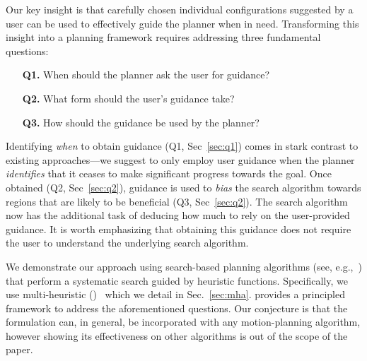 \documentclass{article}
\begin{document}
Our key insight is that carefully chosen individual configurations suggested by a user can be used to effectively guide the planner when in need.
Transforming this insight into a planning framework requires addressing three fundamental questions:

\begin{itemize}
	\item[\textbf{Q1.}] When should the planner ask the user for guidance?
	\item[\textbf{Q2.}] What form should the user's guidance take?
	\item[\textbf{Q3.}] How should the guidance be used by the planner?
\end{itemize}

Identifying \emph{when} to obtain guidance 
(Q1, Sec~\ref{sec:q1}) 
comes in stark contrast to existing approaches---we suggest to only employ user guidance when the planner \emph{identifies} that it ceases to make significant progress towards the goal.
Once obtained (Q2, Sec~\ref{sec:q2}), guidance is used to \emph{bias} the search algorithm towards regions that are likely to be beneficial (Q3, Sec~\ref{sec:q2}). 
The search algorithm now has the additional task of deducing how much to rely on the user-provided guidance.
It is worth emphasizing that obtaining this guidance does not require the user to understand the underlying search algorithm. 

% 



%
We demonstrate our approach using search-based planning algorithms (see, e.g.,~\cite{CCL14}) that perform a systematic search guided by heuristic functions.
Specifically, we use multi-heuristic \astar (\mhastar)~\cite{ASNHL16,NAL15} which we detail in Sec.~\ref{sec:mha}. \mhastar provides a principled framework to address the aforementioned questions.
Our conjecture is that the formulation can, in general, be incorporated with any motion-planning algorithm, however showing its effectiveness on other algorithms is out of the scope of the paper.
\end{document}
